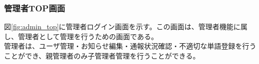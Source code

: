 \documentclass[a4j]{jarticle}
\begin{document}
  \renewcommand{\labelenumi}{\textcircled{\scriptsize \theenumi}}


\subsubsection{管理者TOP画面}
図\ref{fig:admin_top}に管理者ログイン画面を示す。この画面は、管理者機能に属し、管理者として管理を行うための画面である。\\
管理者は、ユーザ管理・お知らせ編集・通報状況確認・不適切な単語登録を行うことができ、親管理者のみ子管理者管理を行うことができる。
\end{document}
